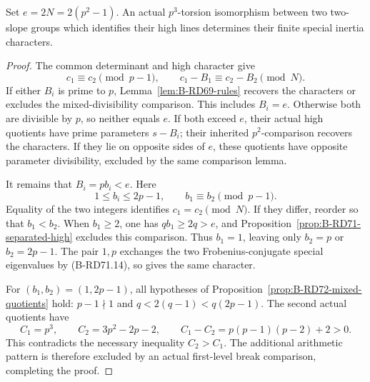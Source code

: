 \begin{proposition}
\label{prop:B-RD72-common-high}
Set \(e=2N=2(p^2-1)\). An actual \(p^3\)-torsion isomorphism
between two two-slope groups which identifies their high lines
determines their finite special inertia characters.
\end{proposition}
\begin{proof}
The common determinant and high character give
\[
 c_1\equiv c_2\pmod{p-1},\qquad
 c_1-B_1\equiv c_2-B_2\pmod N.
 \tag{B-RD72.9}
\]
If either \(B_i\) is prime to \(p\),
Lemma~\ref{lem:B-RD69-rules} recovers the characters or excludes
the mixed-divisibility comparison. This includes \(B_i=e\).
Otherwise both are divisible by \(p\), so neither equals \(e\).
If both exceed \(e\), their actual high quotients have prime
parameters \(s-B_i\); their inherited \(p^2\)-comparison recovers
the characters. If they lie on opposite sides of \(e\), these
quotients have opposite parameter divisibility, excluded by the
same comparison lemma.

It remains that \(B_i=pb_i<e\). Here
\[
 1\le b_i\le2p-1,
 \qquad b_1\equiv b_2\pmod{p-1}.
 \tag{B-RD72.10}
\]
Equality of the two integers identifies \(c_1=c_2\pmod N\).
If they differ, reorder so that \(b_1<b_2\).
When \(b_1\ge2\), one has \(qb_1\ge2q>e\), and
Proposition~\ref{prop:B-RD71-separated-high} excludes this
comparison. Thus \(b_1=1\), leaving only \(b_2=p\) or
\(b_2=2p-1\).
The pair \(1,p\) exchanges the two Frobenius-conjugate special
eigenvalues by (B-RD71.14), so gives the same character.

For \((b_1,b_2)=(1,2p-1)\), all hypotheses of
Proposition~\ref{prop:B-RD72-mixed-quotients} hold:
\(p-1\nmid1\) and \(q<2(q-1)<q(2p-1)\).
The second actual quotients have
\[
 C_1=p^3,
 \qquad C_2=3p^2-2p-2,
 \qquad C_1-C_2=p(p-1)(p-2)+2>0.
 \tag{B-RD72.11}
\]
This contradicts the necessary inequality \(C_2>C_1\).
The additional arithmetic pattern is therefore excluded by an
actual first-level break comparison, completing the proof.
\end{proof}

